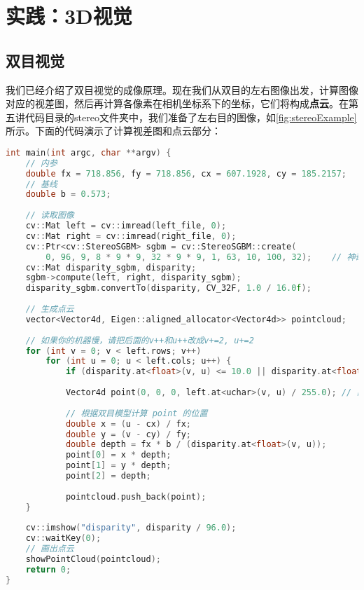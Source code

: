 \section{实践：3D视觉}
\subsection{双目视觉}
我们已经介绍了双目视觉的成像原理。现在我们从双目的左右图像出发，计算图像对应的视差图，然后再计算各像素在相机坐标系下的坐标，它们将构成\textbf{点云}。在第五讲代码目录的stereo文件夹中，我们准备了左右目的图像，如\autoref{fig:stereoExample}所示。下面的代码演示了计算视差图和点云部分：
\begin{lstlisting}[language=C++,caption=slambook/ch5/stereoVision/stereoVision.cpp（部分）]
int main(int argc, char **argv) {
    // 内参
    double fx = 718.856, fy = 718.856, cx = 607.1928, cy = 185.2157;
    // 基线
    double b = 0.573;
    
    // 读取图像
    cv::Mat left = cv::imread(left_file, 0);
    cv::Mat right = cv::imread(right_file, 0);
    cv::Ptr<cv::StereoSGBM> sgbm = cv::StereoSGBM::create(
        0, 96, 9, 8 * 9 * 9, 32 * 9 * 9, 1, 63, 10, 100, 32);    // 神奇的参数
    cv::Mat disparity_sgbm, disparity;
    sgbm->compute(left, right, disparity_sgbm);
    disparity_sgbm.convertTo(disparity, CV_32F, 1.0 / 16.0f);
    
    // 生成点云
    vector<Vector4d, Eigen::aligned_allocator<Vector4d>> pointcloud;
    
    // 如果你的机器慢，请把后面的v++和u++改成v+=2, u+=2
    for (int v = 0; v < left.rows; v++)
        for (int u = 0; u < left.cols; u++) {
            if (disparity.at<float>(v, u) <= 10.0 || disparity.at<float>(v, u) >= 96.0) continue;
            
            Vector4d point(0, 0, 0, left.at<uchar>(v, u) / 255.0); // 前三维为xyz,第四维为颜色
            
            // 根据双目模型计算 point 的位置
            double x = (u - cx) / fx;
            double y = (v - cy) / fy;
            double depth = fx * b / (disparity.at<float>(v, u));
            point[0] = x * depth;
            point[1] = y * depth;
            point[2] = depth;
            
            pointcloud.push_back(point);
    }
    
    cv::imshow("disparity", disparity / 96.0);
    cv::waitKey(0);
    // 画出点云
    showPointCloud(pointcloud);
    return 0;
}
\end{lstlisting}

